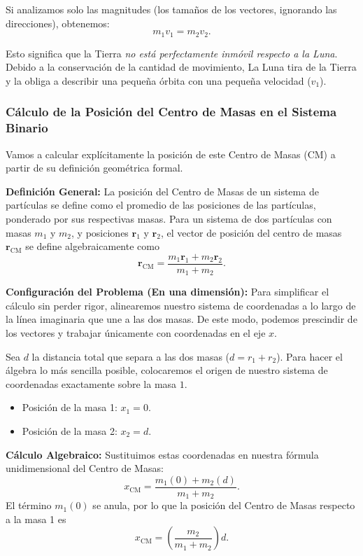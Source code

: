 \documentclass[11pt,a4paper]{book}
\begin{document}
Si analizamos solo las magnitudes (los tamaños de los vectores, ignorando las direcciones), obtenemos:
\begin{equation}
    m_1 v_1 = m_2 v_2.
\end{equation}

Esto significa que la Tierra \textit{no está perfectamente inmóvil respecto a la Luna}. Debido a la conservación de la cantidad de movimiento, La Luna tira de la Tierra y la obliga a describir una pequeña órbita con una pequeña velocidad ($v_1$). 


\subsubsection{Cálculo de la Posición del Centro de Masas en el Sistema Binario}

Vamos a calcular explícitamente la posición de este Centro de Masas (CM) a partir de su definición geométrica formal.

\textbf{Definición General:} La posición del Centro de Masas de un sistema de partículas se define como el promedio de las posiciones de las partículas, ponderado por sus respectivas masas. Para un sistema de dos partículas con masas $m_1$ y $m_2$, y posiciones $\boldsymbol{r}_1$ y $\boldsymbol{r}_2$, el vector de posición del centro de masas $\boldsymbol{r}_{\text{CM}}$ se define algebraicamente como
\begin{equation}
    \boldsymbol{r}_{\text{CM}} = \frac{m_1 \boldsymbol{r}_1 + m_2 \boldsymbol{r}_2}{m_1 + m_2}.
\end{equation}

\textbf{Configuración del Problema (En una dimensión):}
Para simplificar el cálculo sin perder rigor, alinearemos nuestro sistema de coordenadas a lo largo de la línea imaginaria que une a las dos masas. De este modo, podemos prescindir de los vectores y trabajar únicamente con coordenadas en el eje $x$. 

Sea $d$ la distancia total que separa a las dos masas ($d = r_1 + r_2$). Para hacer el álgebra lo más sencilla posible, colocaremos el origen de nuestro sistema de coordenadas exactamente sobre la masa $1$.
\begin{itemize}
    \item Posición de la masa 1: $x_1 = 0$.
    \item Posición de la masa 2: $x_2 = d$.
\end{itemize}

\textbf{Cálculo Algebraico:}
Sustituimos estas coordenadas en nuestra fórmula unidimensional del Centro de Masas:
\begin{equation}
    x_{\text{CM}} = \frac{m_1 (0) + m_2 (d)}{m_1 + m_2}.
\end{equation}
El término $m_1(0)$ se anula, por lo que la posición del Centro de Masas respecto a la masa 1 es
\begin{equation}
    x_{\text{CM}} = \left( \frac{m_2}{m_1 + m_2} \right) d.
    \label{eq:posicion_cm_m1}
\end{equation}
\end{document}
